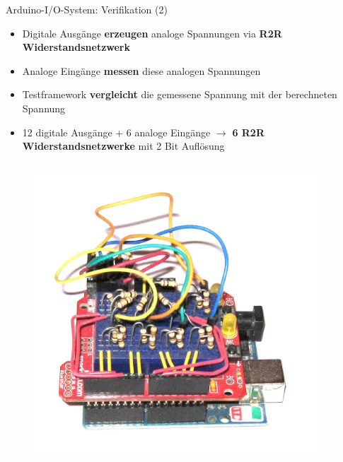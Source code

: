 \documentclass{beamer}
\begin{document}
\begin{frame}{Arduino-I/O-System: Verifikation (2)}
	\begin{itemize}
		\item Digitale Ausg\"ange \textbf{erzeugen} analoge Spannungen via \textbf{R2R Widerstandsnetzwerk}
		\item Analoge Eing\"ange \textbf{messen} diese analogen Spannungen
		\item Testframework \textbf{vergleicht} die gemessene Spannung mit der berechneten Spannung
	\end{itemize}
	\begin{itemize}
		\item 12 digitale Ausg\"ange + 6 analoge Eing\"ange $\rightarrow$ \textbf{6 R2R Widerstandsnetzwerke} mit 2 Bit Aufl\"osung
	\end{itemize}
	\begin{columns}
		\begin{column}{0.4\textwidth}
			\begin{figure}[htbp]
				\centering
				\includegraphics[scale=0.2]{./images/arduinoio-r2r.png}
			\end{figure}
		\end{column}
		\begin{column}{0.4\textwidth}

\end{column}
\end{columns}
\end{frame}
\end{document}
